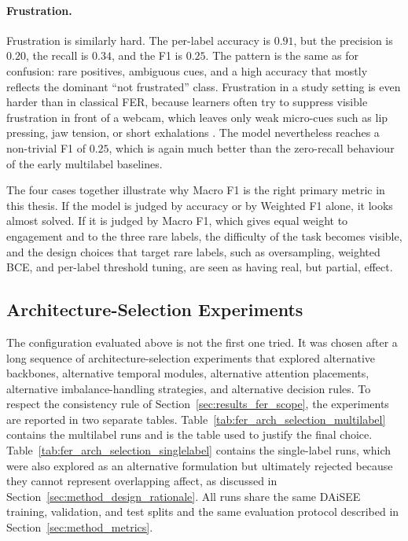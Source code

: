 \paragraph{Frustration.} Frustration is similarly hard. The per-label accuracy is $0.91$, but the precision is $0.20$, the recall is $0.34$, and the F1 is $0.25$. The pattern is the same as for confusion: rare positives, ambiguous cues, and a high accuracy that mostly reflects the dominant ``not frustrated'' class. Frustration in a study setting is even harder than in classical FER, because learners often try to suppress visible frustration in front of a webcam, which leaves only weak micro-cues such as lip pressing, jaw tension, or short exhalations \cite{dmello_language_2012,Baker2010BetterFrustratedThanBored}. The model nevertheless reaches a non-trivial F1 of $0.25$, which is again much better than the zero-recall behaviour of the early multilabel baselines.

The four cases together illustrate why Macro F1 is the right primary metric in this thesis. If the model is judged by accuracy or by Weighted F1 alone, it looks almost solved. If it is judged by Macro F1, which gives equal weight to engagement and to the three rare labels, the difficulty of the task becomes visible, and the design choices that target rare labels, such as oversampling, weighted BCE, and per-label threshold tuning, are seen as having real, but partial, effect.

\subsection{Architecture-Selection Experiments}\label{sec:results_fer_arch_selection}

The configuration evaluated above is not the first one tried. It was chosen after a long sequence of architecture-selection experiments that explored alternative backbones, alternative temporal modules, alternative attention placements, alternative imbalance-handling strategies, and alternative decision rules. To respect the consistency rule of Section~\ref{sec:results_fer_scope}, the experiments are reported in two separate tables. Table~\ref{tab:fer_arch_selection_multilabel} contains the multilabel runs and is the table used to justify the final choice. Table~\ref{tab:fer_arch_selection_singlelabel} contains the single-label runs, which were also explored as an alternative formulation but ultimately rejected because they cannot represent overlapping affect, as discussed in Section~\ref{sec:method_design_rationale}. All runs share the same DAiSEE training, validation, and test splits and the same evaluation protocol described in Section~\ref{sec:method_metrics}.

